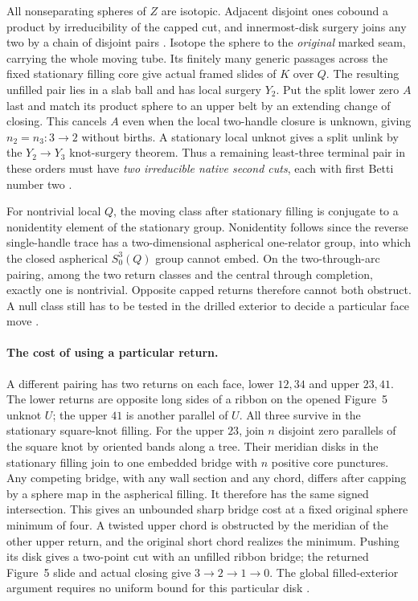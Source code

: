 \documentclass[11pt,letterpaper]{article}
\numberwithin{equation}{section}
\begin{document}
All nonseparating spheres of \(Z\) are isotopic. Adjacent disjoint ones
cobound a product by irreducibility of the capped cut, and innermost-disk
surgery joins any two by a chain of disjoint pairs
\cite[Proposition 4]{Trace1982ThreeHandles}.
Isotope the sphere to the \emph{original} marked seam, carrying the
whole moving tube. Its finitely many generic passages across the
fixed stationary filling core give actual framed slides of \(K\)
over \(Q\). The resulting unfilled pair lies in a slab ball and has
local surgery \(Y_2\). Put the split lower zero \(A\) last and match its
product sphere to an upper belt by an extending change of closing.
This cancels \(A\) even when the local two-handle closure is unknown,
giving \(n_2=n_3:3\to2\) without births. A stationary local unknot gives
a split unlink by the \(Y_2\to Y_3\) knot-surgery theorem. Thus a
remaining least-three terminal pair in these orders must have
\emph{two irreducible native second cuts}, each with first Betti number
two \cite{MeierSchirmerZupan2016Trisections,Baker2026HandleCuts}.

For nontrivial local \(Q\), the moving class after stationary filling is
conjugate to a nonidentity element of the stationary group. Nonidentity
follows since the reverse single-handle trace has a two-dimensional
aspherical one-relator group, into which the closed aspherical
\(S^3_0(Q)\) group cannot embed. On the two-through-arc pairing, among the two return
classes and the central through completion, exactly one is nontrivial. Opposite capped returns therefore cannot both obstruct.
A null class still has to be tested in the drilled exterior to decide a
particular face move \cite{AntolinDicksLinnell2011,Baker2026HandleCuts}.

\paragraph{The cost of using a particular return.}
A different pairing has two returns on each face, lower \(12,34\) and
upper \(23,41\). The lower returns are opposite long sides of a ribbon
on the opened Figure~5 unknot \(U\); the upper \(41\) is another parallel
of \(U\). All three survive in the stationary square-knot filling.
For the upper \(23\), join \(n\) disjoint zero parallels of the square
knot by oriented bands along a tree. Their meridian disks in the
stationary filling join to one embedded bridge with \(n\) positive
core punctures. Any competing bridge, with any wall section and any
chord, differs after capping by a sphere map in the aspherical filling.
It therefore has the same signed intersection. This gives an unbounded
sharp bridge cost at a fixed original sphere minimum of four. A twisted
upper chord is obstructed by the meridian of the other upper return,
and the original short chord realizes the minimum. Pushing its disk
gives a two-point cut with an unfilled ribbon bridge; the returned
Figure~5 slide and actual closing give \(3\to2\to1\to0\). The
global filled-exterior argument requires no uniform bound for this
particular disk \cite{Baker2026HandleCuts}.
\end{document}
